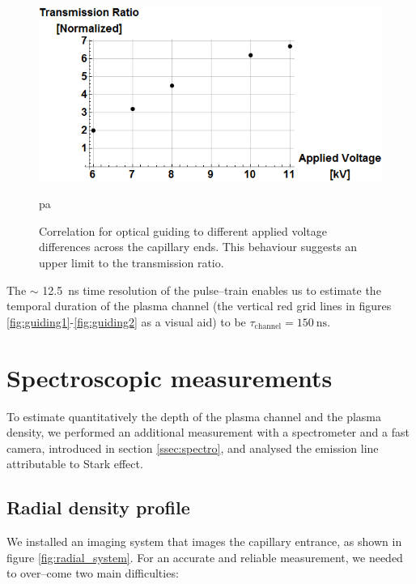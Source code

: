 \documentclass[../main.tex]{subfiles}
\begin{document}
\begin{figure}
    \centering
    \includegraphics[width=\textwidth]{figures/oscillator/voltage vs guiding.png}
    \caption{Correlation for optical guiding to different applied voltage differences across the capillary ends. This behaviour suggests an upper limit to the transmission ratio.}
    \label{fig:voltagevsguiding}pa
\end{figure}

The $\sim$ \SI{12.5}{\ns} time resolution of the pulse--train enables us to estimate the temporal duration of the plasma channel (the vertical red grid lines in figures \ref{fig:guiding1}-\ref{fig:guiding2} as a visual aid) to be $\tau_\text{channel}=\SI{150}{\ns}$.

\section{Spectroscopic measurements}\label{sec:spectro}
To estimate quantitatively the depth of the plasma channel and the plasma density, we performed an additional measurement with a spectrometer and a fast camera, introduced in section \ref{ssec:spectro}, and analysed the emission line attributable to Stark effect.

\subsection{Radial density profile}\label{ssec:radial}
We installed an imaging system that images the capillary entrance, as shown in figure \ref{fig:radial_system}. For an accurate and reliable measurement, we needed to over--come two main difficulties:
\end{document}

